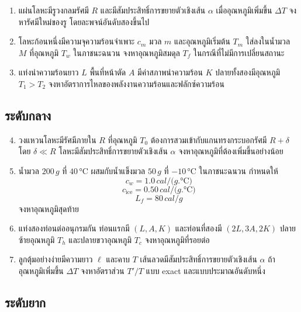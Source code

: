 \begin{enumerate}
    \item แผ่นโลหะมีรูวงกลมรัศมี $R$ และมีสัมประสิทธิ์การขยายตัวเชิงเส้น $\alpha$ เมื่ออุณหภูมิเพิ่มขึ้น $\Delta T$ จงหารัศมีใหม่ของรู โดยละพจน์อันดับสองขึ้นไป

    \item โลหะก้อนหนึ่งมีความจุความร้อนจำเพาะ $c_m$ มวล $m$ และอุณหภูมิเริ่มต้น $T_m$ ใส่ลงในน้ำมวล $M$ ที่อุณหภูมิ $T_w$ ในภาชนะฉนวน จงหาอุณหภูมิสมดุล $T_f$ ในกรณีที่ไม่มีการเปลี่ยนสถานะ

    \item แท่งนำความร้อนยาว $L$ พื้นที่หน้าตัด $A$ มีค่าสภาพนำความร้อน $K$ ปลายทั้งสองมีอุณหภูมิ $T_1>T_2$ จงหาอัตราการไหลของพลังงานความร้อนและฟลักซ์ความร้อน
\end{enumerate}

\subsection*{ระดับกลาง}

\begin{enumerate}
    \setcounter{enumi}{3}
    \item วงแหวนโลหะมีรัศมีภายใน $R$ ที่อุณหภูมิ $T_0$ ต้องการสวมเข้ากับแกนทรงกระบอกรัศมี $R+\delta$ โดย $\delta\ll R$ โลหะมีสัมประสิทธิ์การขยายตัวเชิงเส้น $\alpha$ จงหาอุณหภูมิที่ต้องเพิ่มขึ้นอย่างน้อย

    \item น้ำมวล $200\,\si{g}$ ที่ $40\,\si{\degreeCelsius}$ ผสมกับน้ำแข็งมวล $50\,\si{g}$ ที่ $-10\,\si{\degreeCelsius}$ ในภาชนะฉนวน กำหนดให้
    \[
    c_w=1.0\,\si{cal/(g.\degreeCelsius)}
    \]
    \[
    c_{\text{ice}}=0.50\,\si{cal/(g.\degreeCelsius)}
    \]
    \[
    L_f=80\,\si{cal/g}
    \]
    จงหาอุณหภูมิสุดท้าย

    \item แท่งสองท่อนต่ออนุกรมกัน ท่อนแรกมี $(L,A,K)$ และท่อนที่สองมี $(2L,3A,2K)$ ปลายซ้ายอุณหภูมิ $T_h$ และปลายขวาอุณหภูมิ $T_c$ จงหาอุณหภูมิที่รอยต่อ

    \item ลูกตุ้มอย่างง่ายมีความยาว $\ell$ และคาบ $T$ เส้นลวดมีสัมประสิทธิ์การขยายตัวเชิงเส้น $\alpha$ ถ้าอุณหภูมิเพิ่มขึ้น $\Delta T$ จงหาอัตราส่วน $T'/T$ แบบ exact และแบบประมาณอันดับหนึ่ง
\end{enumerate}

\subsection*{ระดับยาก}

